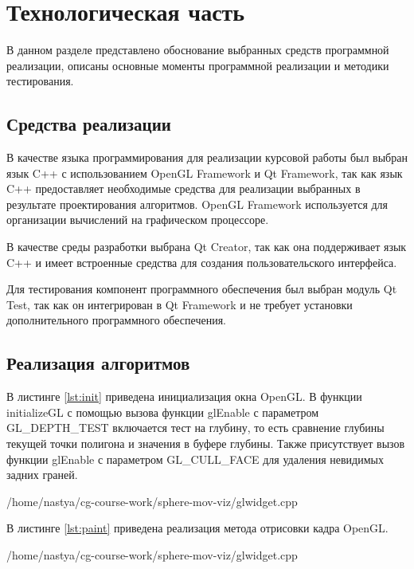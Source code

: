 \chapter{Технологическая часть}

В данном разделе представлено обоснование выбранных средств программной реализации, описаны основные моменты программной реализации и методики тестирования.

\section{Средства реализации}

В качестве языка программирования для реализации курсовой работы был выбран язык C++ с использованием OpenGL Framework и Qt Framework, так как язык C++ предоставляет необходимые средства для реализации выбранных в результате проектирования алгоритмов. OpenGL Framework используется для организации вычислений на графическом процессоре.

В качестве среды разработки выбрана Qt Creator, так как она поддерживает язык C++ и имеет встроенные средства для создания пользовательского интерфейса.

Для тестирования компонент программного обеспечения был выбран модуль Qt Test, так как он интегрирован в Qt Framework и не требует установки дополнительного программного обеспечения.

\section{Реализация алгоритмов}

В листинге \ref{lst:init} приведена инициализация окна OpenGL. В функции initializeGL с помощью вызова функции glEnable с параметром GL\_DEPTH\_TEST включается тест на глубину, то есть сравнение глубины текущей точки полигона и значения в буфере глубины. Также присутствует вызов функции glEnable с параметром GL\_CULL\_FACE для удаления невидимых задних граней.

\pagebreak

\begin{lstinputlisting}[
	caption={Инициализация opengl-окна},
	label={lst:init},
	style={cpp},
	linerange={99-115},
	]{/home/nastya/cg-course-work/sphere-mov-viz/glwidget.cpp}
\end{lstinputlisting}

В листинге \ref{lst:paint} приведена реализация метода отрисовки кадра OpenGL.

\begin{lstinputlisting}[
	caption={Отрисовка кадра},
	label={lst:paint},
	style={cpp},
	linerange={177-199},
	]{/home/nastya/cg-course-work/sphere-mov-viz/glwidget.cpp}
\end{lstinputlisting}

